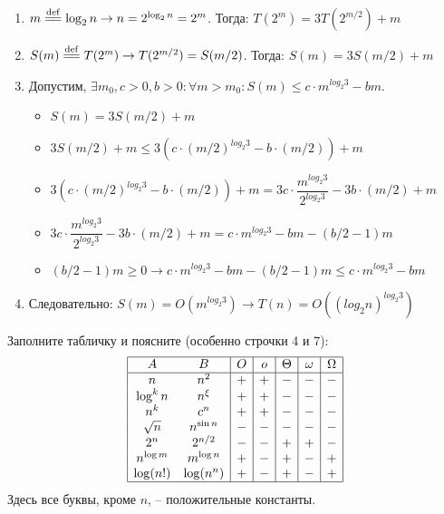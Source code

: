 \begin{solution}
    \leavevmode\vspace{1pt}

    \begin{enumerate}
        \item $m \defeq \log_2{n} \rightarrow n = 2^{\log_2{n}} = 2^m$. Тогда: $T(2^m) = 3 T(2^{m / 2}) + m$
        \item $S(m) \defeq T(2^m) \rightarrow T(2^{m / 2}) = S(m / 2)$. Тогда: $S(m) = 3 S(m / 2) + m$
        \item Допустим, \( \exists m_0, c > 0, b > 0 : \forall m > m_0 : S(m) \le c \cdot m^{log_2{3}} - bm \).
            \begin{itemize}
                \item \( S(m) = 3 S(m / 2) + m \)
                \item \( 3 S(m / 2) + m \le 3 \left( c \cdot (m / 2)^{log_2{3}} - b \cdot (m / 2) \right) + m \)
                \item \( 3 \left( c \cdot (m / 2)^{log_2{3}} - b \cdot (m / 2) \right) + m = 3c \cdot \dfrac{m^{log_2{3}}}{2^{log_2{3}}} - 3b \cdot (m / 2) + m \)
                \item \( 3c \cdot \dfrac{m^{log_2{3}}}{2^{log_2{3}}} - 3b \cdot (m / 2) + m = c \cdot m^{log_2{3}} - bm - (b / 2 - 1)m \)
                \item \( (b / 2 - 1)m \ge 0 \rightarrow c \cdot m^{log_2{3}} - bm - (b / 2 - 1)m \le c \cdot m^{log_2{3}} - bm \)
            \end{itemize}
        \item Следовательно: \( S(m) = O(m^{log_2{3}}) \rightarrow T(n) = O((log_2{n})^{log_2{3}}) \)
    \end{enumerate}
\end{solution}


\begin{problem}
    Заполните табличку и поясните (особенно строчки 4 и 7):
    $$
    \begin{array}{|cc|c|c|c|c|c|}
        \hline
        A & B & O & o & \Theta & \omega & \Omega \\
        \hline
        n & n^2 & + & + & - & - & - \\
        \log^k n & n^{\xi} & + & + & - & - & - \\
        n^k & c^n & + & + & - & - & - \\
        \sqrt{n} & n^{\sin n} & - & - & - & - & - \\
        2^n & 2^{n \slash 2} & - & - & + & + & - \\
        n^{\log m} & m^{\log n} & + & - & + & - & + \\
        \log (n!) & \log(n^n) & + & - & + & - & + \\
        \hline
    \end{array}
    $$
    Здесь все буквы, кроме $n$, -- положительные константы.
\end{problem}


